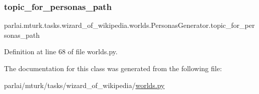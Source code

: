 \subsubsection{\texorpdfstring{topic\+\_\+for\+\_\+personas\+\_\+path}{topic\_for\_personas\_path}}
{\footnotesize\ttfamily parlai.\+mturk.\+tasks.\+wizard\+\_\+of\+\_\+wikipedia.\+worlds.\+Personas\+Generator.\+topic\+\_\+for\+\_\+personas\+\_\+path}



Definition at line 68 of file worlds.\+py.



The documentation for this class was generated from the following file\+:\begin{DoxyCompactItemize}
\item 
parlai/mturk/tasks/wizard\+\_\+of\+\_\+wikipedia/\hyperlink{parlai_2mturk_2tasks_2wizard__of__wikipedia_2worlds_8py}{worlds.\+py}\end{DoxyCompactItemize}
